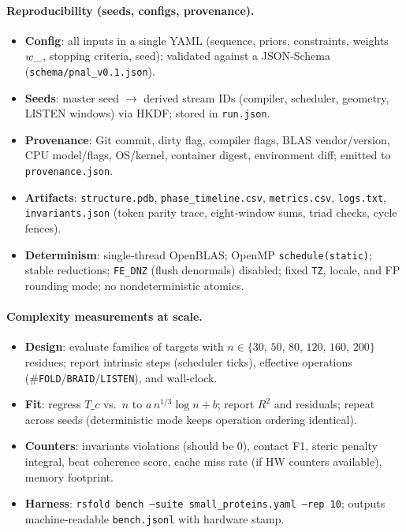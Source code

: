 \documentclass[12pt,a4paper]{article}
\begin{document}
\paragraph{Reproducibility (seeds, configs, provenance).}
\begin{itemize}
  \item \textbf{Config}: all inputs in a single YAML (sequence, priors, constraints, weights $w\_\*$, stopping criteria, seed); validated against a JSON‑Schema (\texttt{schema/pnal\_v0.1.json}).
  \item \textbf{Seeds}: master seed $\to$ derived stream IDs (compiler, scheduler, geometry, LISTEN windows) via HKDF; stored in \texttt{run.json}.
  \item \textbf{Provenance}: Git commit, dirty flag, compiler flags, BLAS vendor/version, CPU model/flags, OS/kernel, container digest, environment diff; emitted to \texttt{provenance.json}.
  \item \textbf{Artifacts}: \texttt{structure.pdb}, \texttt{phase\_timeline.csv}, \texttt{metrics.csv}, \texttt{logs.txt}, \texttt{invariants.json} (token parity trace, eight‑window sums, triad checks, cycle fences).
  \item \textbf{Determinism}: single‑thread OpenBLAS; OpenMP \texttt{schedule(static)}; stable reductions; \texttt{FE\_DNZ} (flush denormals) disabled; fixed \texttt{TZ}, locale, and FP rounding mode; no nondeterministic atomics.
\end{itemize}

\paragraph{Complexity measurements at scale.}
\begin{itemize}
  \item \textbf{Design}: evaluate families of targets with $n\in\{30,\,50,\,80,\,120,\,160,\,200\}$ residues; report intrinsic steps (scheduler ticks), effective operations (\#\texttt{FOLD}/\texttt{BRAID}/\texttt{LISTEN}), and wall‑clock.
  \item \textbf{Fit}: regress $T\_c$ vs.\ $n$ to $a\,n^{1/3}\log n + b$; report $R^2$ and residuals; repeat across seeds (deterministic mode keeps operation ordering identical).
  \item \textbf{Counters}: invariants violations (should be 0), contact F1, steric penalty integral, beat coherence score, cache miss rate (if HW counters available), memory footprint.
  \item \textbf{Harness}: \texttt{rsfold bench --suite small\_proteins.yaml --rep 10}; outputs machine‑readable \texttt{bench.jsonl} with hardware stamp.
\end{itemize}
\end{document}
